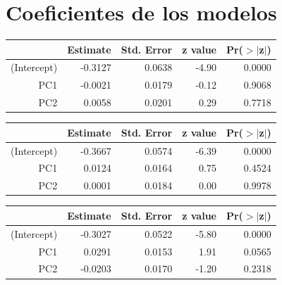 \documentclass[a4paper,12pt]{Latex/Classes/PhDthesisPSnPDF}
\begin{document}
\section{Coeficientes de los modelos}

\begin{center}
\begin{table}[ht]
\centering
\begin{tabular}{rrrrr}
  \hline
 & Estimate & Std. Error & z value & Pr($>$$|$z$|$) \\ 
  \hline
(Intercept) & -0.3127 & 0.0638 & -4.90 & 0.0000 \\ 
  PC1 & -0.0021 & 0.0179 & -0.12 & 0.9068 \\ 
  PC2 & 0.0058 & 0.0201 & 0.29 & 0.7718 \\ 
   \hline
\end{tabular}
\end{table}\end{center}

\begin{center}
\begin{table}[ht]
\centering
\begin{tabular}{rrrrr}
  \hline
 & Estimate & Std. Error & z value & Pr($>$$|$z$|$) \\ 
  \hline
(Intercept) & -0.3667 & 0.0574 & -6.39 & 0.0000 \\ 
  PC1 & 0.0124 & 0.0164 & 0.75 & 0.4524 \\ 
  PC2 & 0.0001 & 0.0184 & 0.00 & 0.9978 \\ 
   \hline
\end{tabular}
\end{table}\end{center}
\begin{center}
\begin{table}[ht]
\centering
\begin{tabular}{rrrrr}
  \hline
 & Estimate & Std. Error & z value & Pr($>$$|$z$|$) \\ 
  \hline
(Intercept) & -0.3027 & 0.0522 & -5.80 & 0.0000 \\ 
  PC1 & 0.0291 & 0.0153 & 1.91 & 0.0565 \\ 
  PC2 & -0.0203 & 0.0170 & -1.20 & 0.2318 \\ 
   \hline
\end{tabular}
\end{table}\end{center}
\end{document}
